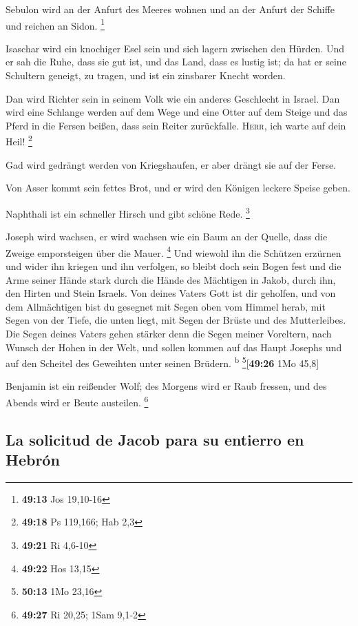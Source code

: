  Sebulon wird an der Anfurt des Meeres wohnen und an der
Anfurt der Schiffe und reichen an Sidon. \footnote{\textbf{49:13} Jos
  19,10-16}

 Isaschar wird ein knochiger Esel sein und sich lagern
zwischen den Hürden.  Und er sah die Ruhe, dass sie gut
ist, und das Land, dass es lustig ist; da hat er seine Schultern
geneigt, zu tragen, und ist ein zinsbarer Knecht worden.

 Dan wird Richter sein in seinem Volk wie ein anderes
Geschlecht in Israel.  Dan wird eine Schlange werden auf
dem Wege und eine Otter auf dem Steige und das Pferd in die Fersen
beißen, dass sein Reiter zurückfalle.  \textsc{Herr}, ich
warte auf dein Heil! \footnote{\textbf{49:18} Ps 119,166; Hab 2,3}

 Gad wird gedrängt werden von Kriegshaufen, er aber
drängt sie auf der Ferse.

 Von Asser kommt sein fettes Brot, und er wird den
Königen leckere Speise geben.

 Naphthali ist ein schneller Hirsch und gibt schöne Rede.
\footnote{\textbf{49:21} Ri 4,6-10}

 Joseph wird wachsen, er wird wachsen wie ein Baum an der
Quelle, dass die Zweige emporsteigen über die Mauer. \footnote{\textbf{49:22}
  Hos 13,15}  Und wiewohl ihn die Schützen erzürnen und
wider ihn kriegen und ihn verfolgen,  so bleibt doch sein
Bogen fest und die Arme seiner Hände stark durch die Hände des Mächtigen
in Jakob, durch ihn, den Hirten und Stein Israels.  Von
deines Vaters Gott ist dir geholfen, und von dem Allmächtigen bist du
gesegnet mit Segen oben vom Himmel herab, mit Segen von der Tiefe, die
unten liegt, mit Segen der Brüste und des Mutterleibes. 
Die Segen deines Vaters gehen stärker denn die Segen meiner Voreltern,
nach Wunsch der Hohen in der Welt, und sollen kommen auf das Haupt
Josephs und auf den Scheitel des Geweihten unter seinen Brüdern.
\textsuperscript{b} \footnote{\textbf{50:13} 1Mo 23,16}{[}\textbf{49:26}
1Mo 45,8{]}

 Benjamin ist ein reißender Wolf; des Morgens wird er
Raub fressen, und des Abends wird er Beute austeilen. \footnote{\textbf{49:27}
  Ri 20,25; 1Sam 9,1-2}

\hypertarget{la-solicitud-de-jacob-para-su-entierro-en-hebruxf3n}{%
\subsection{La solicitud de Jacob para su entierro en
Hebrón}\label{la-solicitud-de-jacob-para-su-entierro-en-hebruxf3n}}

